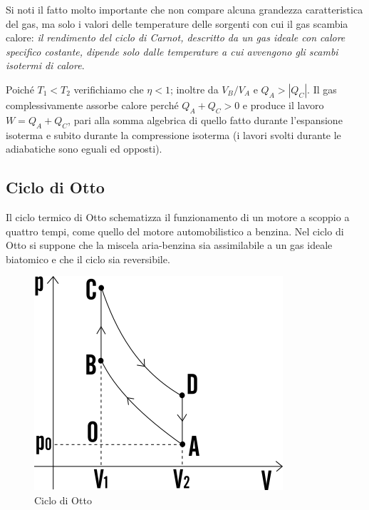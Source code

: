 \documentclass[class=book, crop=false, oneside, 12pt]{standalone}
\begin{document}
Si noti il fatto molto importante che non compare alcuna grandezza caratteristica del gas, ma solo i valori delle temperature delle sorgenti con cui il gas scambia calore: 
\emph{il rendimento del ciclo di Carnot, descritto da un gas ideale con calore specifico costante, dipende solo dalle temperature a cui avvengono gli scambi isotermi di calore}.

Poiché \(T_1 < T_2\) verifichiamo che \(\eta<1\); inoltre da \(V_B / V_A\) e \(Q_A > | Q_C | \). 
Il gas complessivamente assorbe calore perché \(Q_A + Q_C > 0\) e produce il lavoro \(W = Q_A + Q_C\), pari alla somma algebrica di quello fatto durante l'espansione isoterma e subito durante la compressione isoterma (i lavori svolti durante le adiabatiche sono eguali ed opposti). 

\subsection{Ciclo di Otto}

Il ciclo termico di Otto schematizza il funzionamento di un motore a scoppio a quattro tempi, come quello del motore automobilistico a benzina. 
Nel ciclo di Otto si suppone che la miscela aria-benzina sia assimilabile a un gas ideale biatomico e che il ciclo sia reversibile. 

\begin{figure}[h]
    \includegraphics[scale=0.4]{ciclo-otto}
    \centering
    \caption{Ciclo di Otto}
\end{figure}
\end{document}
